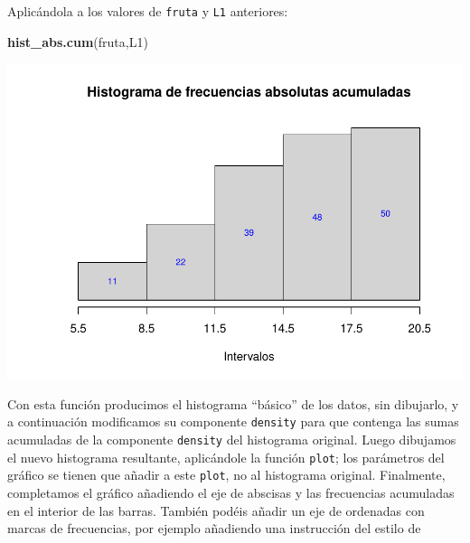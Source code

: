 \documentclass[
]{book}
\newenvironment{Shaded}{\begin{snugshade}}{\end{snugshade}}
\newcommand{\DataTypeTok}[1]{\textcolor[rgb]{0.13,0.29,0.53}{#1}}
\newcommand{\DecValTok}[1]{\textcolor[rgb]{0.00,0.00,0.81}{#1}}
\newcommand{\KeywordTok}[1]{\textcolor[rgb]{0.13,0.29,0.53}{\textbf{#1}}}
\newcommand{\NormalTok}[1]{#1}
\newcommand{\OperatorTok}[1]{\textcolor[rgb]{0.81,0.36,0.00}{\textbf{#1}}}
\theoremstyle{definition}
\theoremstyle{definition}
\theoremstyle{definition}
\theoremstyle{remark}
\begin{document}
Aplicándola a los valores de \texttt{fruta} y \texttt{L1} anteriores:

\begin{Shaded}
\begin{Highlighting}[]
\KeywordTok{hist\_abs.cum}\NormalTok{(fruta,L1)}
\end{Highlighting}
\end{Shaded}

\begin{center}\includegraphics[width=0.9\linewidth]{13chap13_Agrupados_files/figure-latex/unnamed-chunk-76-1} \end{center}

Con esta función producimos el histograma ``básico'' de los datos, sin dibujarlo, y a continuación
modificamos su componente \texttt{density} para que contenga las sumas acumuladas de la componente \texttt{density} del histograma original. Luego dibujamos el nuevo histograma resultante, aplicándole la función \texttt{plot}; los parámetros del gráfico se tienen que añadir a este \texttt{plot}, no al histograma original. Finalmente, completamos el gráfico añadiendo el eje de abscisas y las frecuencias acumuladas en el interior de las barras. También podéis añadir un eje de ordenadas con marcas de frecuencias, por ejemplo añadiendo una instrucción del estilo de

\begin{Shaded}
\end{Shaded}
\end{document}
